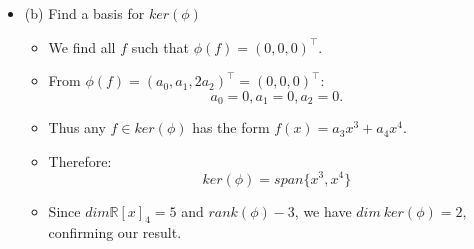 \documentclass{article}
\begin{document}
\begin{itemize}
\begin{itemize}
\begin{itemize}
        \end{itemize}
        \item (b) Find a basis for $ker(\phi)$
        \begin{itemize}
            \item We find all $f$ such that $\phi(f) = (0,0,0)^\top$.
            \item From $\phi(f) = (a_0,a_1,2a_2)^\top = (0,0,0)^\top$:
            \[
            a_0 = 0, a_1 = 0, a_2 = 0.
            \]
            \item Thus any $f \in ker(\phi)$ has the form $f(x) = a_3x^3 + a_4x^4$.
            \item Therefore:
            \[
            ker(\phi) = span\{x^3,x^4\}
            \]
            \item Since $dim\mathbb{R}[x]_4 = 5$ and $rank(\phi)-3$, we have $dim \ ker(\phi)=2$, confirming our result.
        \end{itemize}
    \end{itemize}
\end{itemize}
\end{document}
